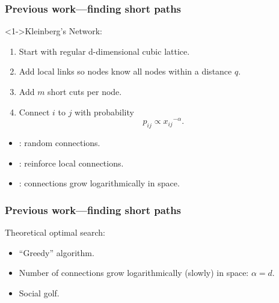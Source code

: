 \begin{frame}
  \frametitle{Previous work---finding short paths}

  \begin{block}<1->{Kleinberg's Network:}
    \begin{enumerate}
    \item<2->
      Start with
      regular d-dimensional cubic lattice.
    \item<3-> 
      Add local links so 
      nodes know all nodes within a distance $q$.
    \item<4->
      Add $m$ short cuts per node.
    \item<5->  
      Connect $i$ to $j$ with probability 
      $$ p_{ij} \propto {x_{ij}}^{-\alpha}. $$
    \end{enumerate}
  \end{block}

  \begin{block}{}
    \begin{itemize}
    \item<6-> 
      : random connections.
    \item<6->  
      : reinforce local connections.
    \item<6-> 
      : connections grow logarithmically in space.
    \end{itemize}
  \end{block}

\end{frame}


\begin{frame}
  \frametitle{Previous work---finding short paths}

  \begin{block}{Theoretical optimal search:}
    \begin{itemize}
    \item<1-> 
      ``Greedy'' algorithm.
    \item<2-> 
      Number of connections grow logarithmically (slowly)
      in space: $\alpha=d$.
    \item<3-> 
      Social golf.
    \end{itemize}

    \bigskip


    \bigskip
    
  \end{block}
  
\end{frame}

